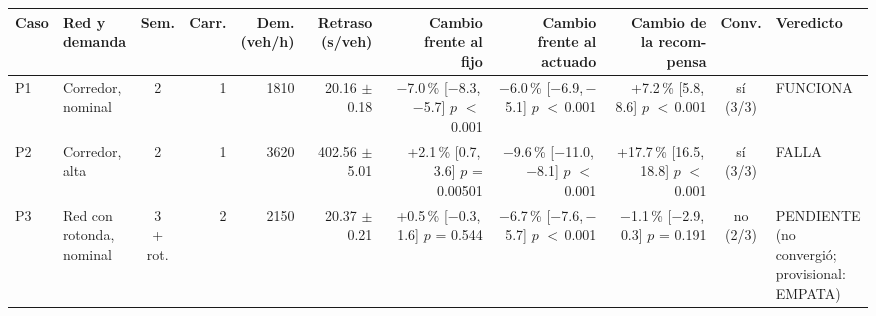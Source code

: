 \begin{table}[H]
\centering
\scriptsize
\setlength{\tabcolsep}{1.5pt}
\begin{tabular}{llcrrrrrrcl}
\toprule
Caso & \makecell[l]{Red y\\demanda} & Sem. & Carr. & \makecell{Dem.\\(veh/h)} & \makecell{Retraso\\(s/veh)} & \makecell{Cambio\\frente al\\fijo} & \makecell{Cambio\\frente al\\actuado} & \makecell{Cambio de\\la recom-\\pensa} & Conv. & Veredicto \\
\midrule
P1 & \makecell[l]{Corredor,\\{}nominal} & 2 & 1 & 1810 & \makecell[r]{20.16\\{}$\pm$ 0.18} & \makecell[r]{$-$7.0\,\%\\{}[$-$8.3,\,$-$5.7]\\$p$ $<$\,0.001} & \makecell[r]{$-$6.0\,\%\\{}[$-$6.9,\,$-$5.1]\\$p$ $<$\,0.001} & \makecell[r]{+7.2\,\%\\{}[5.8,\,8.6]\\$p$ $<$\,0.001} & \makecell[c]{sí\\{}(3/3)} & FUNCIONA \\
P2 & \makecell[l]{Corredor,\\{}alta} & 2 & 1 & 3620 & \makecell[r]{402.56\\{}$\pm$ 5.01} & \makecell[r]{+2.1\,\%\\{}[0.7,\,3.6]\\$p$ = 0.00501} & \makecell[r]{$-$9.6\,\%\\{}[$-$11.0,\,$-$8.1]\\$p$ $<$\,0.001} & \makecell[r]{+17.7\,\%\\{}[16.5,\,18.8]\\$p$ $<$\,0.001} & \makecell[c]{sí\\{}(3/3)} & FALLA \\
P3 & \makecell[l]{Red con\\{}rotonda,\\{}nominal} & \makecell[c]{3\\{}+ rot.} & 2 & 2150 & \makecell[r]{20.37\\{}$\pm$ 0.21} & \makecell[r]{+0.5\,\%\\{}[$-$0.3,\,1.6]\\$p$ = 0.544} & \makecell[r]{$-$6.7\,\%\\{}[$-$7.6,\,$-$5.7]\\$p$ $<$\,0.001} & \makecell[r]{$-$1.1\,\%\\{}[$-$2.9,\,0.3]\\$p$ = 0.191} & \makecell[c]{no\\{}(2/3)} & \makecell[l]{PENDIENTE\\{}(no convergió;\\{}provisional:\\{}EMPATA)} \\

\end{tabular}
\end{table}
